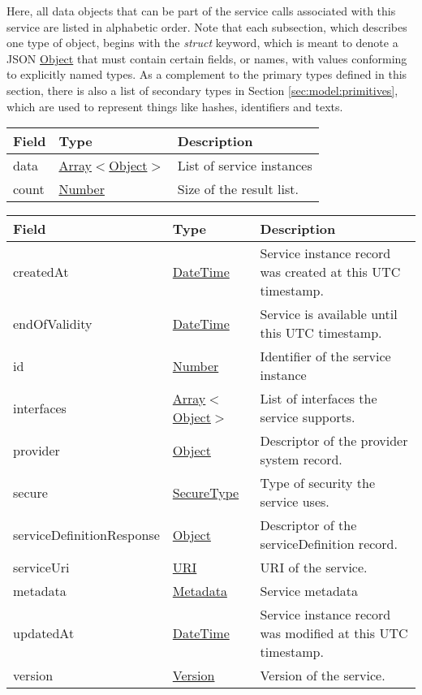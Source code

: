 \documentclass[a4paper]{arrowhead}
\newcommand{\pref}[1]{{\textcolor{ArrowheadGrey}{\hyperref[sec:model:primitives:#1]{#1}}}}
\begin{document}
Here, all data objects that can be part of the service calls associated with this service are listed in alphabetic order.
Note that each subsection, which describes one type of object, begins with the \textit{struct} keyword, which is meant to denote a JSON \pref{Object} that must contain certain fields, or names, with values conforming to explicitly named types.
As a complement to the primary types defined in this section, there is also a list of secondary types in Section \ref{sec:model:primitives}, which are used to represent things like hashes, identifiers and texts.


\begin{table}[ht!]
\begin{tabularx}{\textwidth}{| p{4.25cm} | p{3.5cm} | X |} \hline
\rowcolor{gray!33} Field & Type      & Description \\ \hline
data & \pref{Array}$<$\pref{Object}$>$     & List of service instances \\ \hline
count & \pref{Number} & Size of the result list. \\ \hline
\end{tabularx}
\end{table}


\begin{table}[ht!]
\begin{tabularx}{\textwidth}{| p{4.25cm} | p{3.5cm} | X |} \hline
\rowcolor{gray!33} Field & Type      & Description \\ \hline
createdAt & \pref{DateTime} & Service instance record was created at this UTC timestamp. \\ \hline
endOfValidity & \pref{DateTime} & Service is available until this UTC timestamp. \\ \hline
id & \pref{Number} & Identifier of the service instance \\ \hline
interfaces & \pref{Array}$<$\pref{Object}$>$     & List of interfaces the service supports. \\ \hline
provider & \pref{Object} & Descriptor of the provider system record. \\ \hline
secure &\pref{SecureType}  & Type of security the service uses. \\ \hline
serviceDefinitionResponse & \pref{Object} & Descriptor of the serviceDefinition record. \\ \hline
serviceUri &\pref{URI}         & URI of the service. \\ \hline
metadata & \pref{Metadata}     & Service metadata \\ \hline
updatedAt & \pref{DateTime} & Service instance record was modified at this UTC timestamp. \\ \hline
version &\pref{Version}     & Version of the service. \\ \hline
\end{tabularx}
\end{table}
\end{document}
